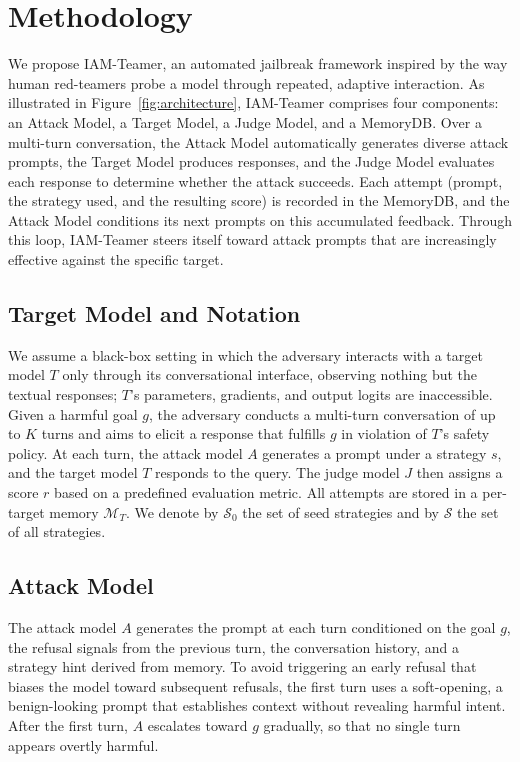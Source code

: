 \section{Methodology}
\label{sec:method}

We propose IAM-Teamer, an automated jailbreak framework inspired by the way human red-teamers probe a model through repeated, adaptive interaction.
As illustrated in Figure~\ref{fig:architecture}, IAM-Teamer comprises four components: an Attack Model, a Target Model, a Judge Model, and a MemoryDB.
Over a multi-turn conversation, the Attack Model automatically generates diverse attack prompts, the Target Model produces responses, and the Judge Model evaluates each response to determine whether the attack succeeds.
Each attempt (prompt, the strategy used, and the resulting score) is recorded in the MemoryDB, and the Attack Model conditions its next prompts on this accumulated feedback.
Through this loop, IAM-Teamer steers itself toward attack prompts that are increasingly effective against the specific target.

\subsection{Target Model and Notation}
\label{sec:threat}

We assume a black-box setting in which the adversary interacts with a target model $T$ only through its conversational interface, observing nothing but the textual responses; $T$'s parameters, gradients, and output logits are inaccessible.
Given a harmful goal $g$, the adversary conducts a multi-turn conversation of up to $K$ turns and aims to elicit a response that fulfills $g$ in violation of $T$'s safety policy.
At each turn, the attack model $A$ generates a prompt under a strategy $s$, and the target model $T$ responds to the query. The judge model $J$ then assigns a score $r$ based on a predefined evaluation metric.
All attempts are stored in a per-target memory $\mathcal{M}_T$.
We denote by $\mathcal{S}_0$ the set of seed strategies and by $\mathcal{S}$ the set of all strategies.

\subsection{Attack Model}
\label{sec:attack}

The attack model $A$ generates the prompt at each turn conditioned on the goal $g$, the refusal signals from the previous turn, the conversation history, and a strategy hint derived from memory.
To avoid triggering an early refusal that biases the model toward subsequent refusals, the first turn uses a soft-opening, a benign-looking prompt that establishes context without revealing harmful intent.
After the first turn, $A$ escalates toward $g$ gradually, so that no single turn appears overtly harmful.

